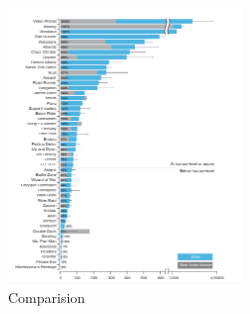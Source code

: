 \begin{figure}[h]
	\begin{center}
		\includegraphics[width=235px,height=275px]{src/img/state/screenshot}
		\caption{Comparision\cite{nature}} \label{fig:comp}
    \end{center}
\end{figure}




















